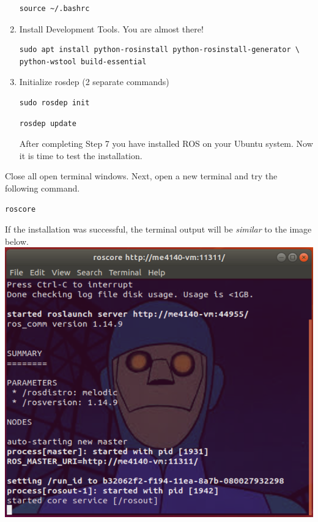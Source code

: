 \documentclass[12pt]{article}
\begin{document}
\begin{description}
\begin{enumerate}
\begin{verbatim} 
source ~/.bashrc 
\end{verbatim}

\item Install Development Tools. You are almost there! 
\begin{verbatim} 
sudo apt install python-rosinstall python-rosinstall-generator \ 
python-wstool build-essential
\end{verbatim}

	\item Initialize rosdep (2 separate commands) 
	\begin{verbatim}
sudo rosdep init
	\end{verbatim}
	
	\begin{verbatim} 
rosdep update
	\end{verbatim}


		


After completing Step 7 you have installed ROS on your Ubuntu system. Now it is time to test the installation. 
\end{enumerate}

\newpage

\item[\textbf{\underline{Test ROS Installation}}]

\item Close all open terminal windows. Next, open a new terminal and try the following command.\\
\begin{verbatim}  
roscore
\end{verbatim}

If the installation was successful, the terminal output will be {\it similar} to the image below. \vspace{3mm}\\

\includegraphics[scale=1]{roscore_charlie.png} \vspace{2mm}\\


\end{description}
\end{document}
